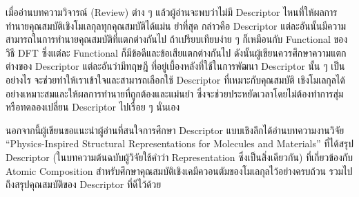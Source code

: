 เมื่ออ่านบทความวิจารณ์ (Review) ต่าง ๆ แล้วผู้อ่านจะพบว่าไม่มี Descriptor ไหนที่ให้ผลการทำนายคุณสมบัติเชิงโมเลกุลทุกคุณสมบัติได้แม่น%
ยำที่สุด กล่าวคือ Descriptor แต่ละอันนั้นมีความสามารถในการทำนายคุณสมบัติที่แตกต่างกันไป ถ้าเปรียบเทียบง่าย ๆ ก็เหมือนกับ Functional 
ของวิธี DFT ซึ่งแต่ละ Functional ก็มีข้อดีและข้อเสียแตกต่างกันไป ดังนั้นผู้เขียนควรศึกษาความแตกต่างของ Descriptor แต่ละอันว่ามีทฤษฎี%
ที่อยู่เบื้องหลังที่ใช้ในการพัฒนา Descriptor นั้น ๆ เป็นอย่างไร จะช่วยทำให้เราเข้าใจและสามารถเลือกใช้ Descriptor ที่เหมาะกับคุณสมบัติ%
เชิงโมเลกุลได้อย่างเหมาะสมและให้ผลการทำนายที่ถูกต้องและแม่นยำ ซึ่งจะช่วยประหยัดเวลาโดยไม่ต้องทำการสุ่มหรือทดลองเปลี่ยน Descriptor 
ไปเรื่อย ๆ นั่นเอง

นอกจากนี้ผู้เขียนขอแนะนำผู้อ่านที่สนใจการศึกษา Descriptor แบบเชิงลึกได้อ่านบทความงานวิจัย \enquote{Physics-Inspired Structural 
Representations for Molecules and Materials}\autocite{musil2021} ที่ได้สรุป Descriptor (ในบทความต้นฉบับผู้วิจัยใช้คำว่า 
Representation ซึ่งเป็นสิ่งเดียวกัน) ที่เกี่ยวข้องกับ Atomic Composition สำหรับศึกษาคุณสมบัติเชิงเคมีควอนตัมของโมเลกุลไว้อย่างครบถ้วน 
รวมไปถึงสรุปคุณสมบัติของ Descriptor ที่ดีไว้ด้วย
